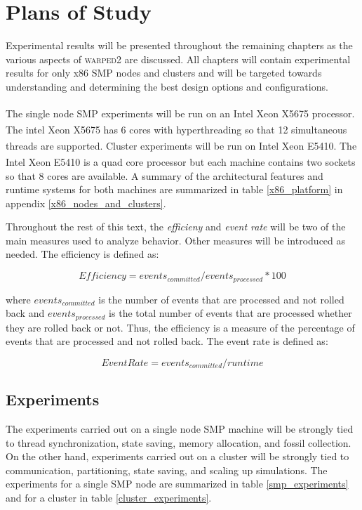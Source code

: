 \documentclass[11pt]{book}
\begin{document}
\chapter{Plans of Study}\label{plans_of_study}

Experimental results will be presented throughout the remaining chapters as the various aspects
of \textsc{warped2} are discussed. All chapters will contain experimental results for only x86
SMP nodes and clusters and will be targeted towards understanding and determining the best
design options and configurations.

The single node SMP experiments will be run on an Intel\textsuperscript{\textregistered}
Xeon\textsuperscript{\textregistered} X5675 processor. The intel\textsuperscript{\textregistered} Xeon
\textsuperscript{\textregistered} X5675 has 6 cores with hyperthreading so that 12 simultaneous
threads are supported. Cluster experiments will be run on Intel\textsuperscript{\textregistered}
Xeon\textsuperscript{\textregistered} E5410. The Intel\textsuperscript{\textregistered}
Xeon\textsuperscript{\textregistered} E5410 is a quad core processor but each machine contains
two sockets so that 8 cores are available. A summary of the architectural features and runtime
systems for both machines are summarized in table \ref{x86_platform} in appendix \ref{x86_nodes_and_clusters}.

Throughout the rest of this text, the \emph{efficieny} and \emph{event rate} will be two of the main
measures used to analyze behavior. Other measures will be introduced as needed. The efficiency
is defined as:

$$ Efficiency = {events_{committed}}/{events_{processed}} * 100 $$

\noindent
where $events_{committed}$ is the number of events that are processed and not rolled back and
$events_{processed}$ is the total number of events that are processed whether they are rolled
back or not. Thus, the efficiency is a measure of the percentage of events that are processed
and not rolled back. The event rate is defined as:

$$ Event Rate = {events_{committed}}/{runtime} $$

\section{Experiments}

The experiments carried out on a single node SMP machine will be strongly tied to thread
synchronization, state saving, memory allocation, and fossil collection. On the other hand,
experiments carried out on a cluster will be strongly tied to communication, partitioning,
state saving, and scaling up simulations. The experiments for a single SMP node are summarized
in table \ref{smp_experiments} and for a cluster in table \ref{cluster_experiments}.
\end{document}
